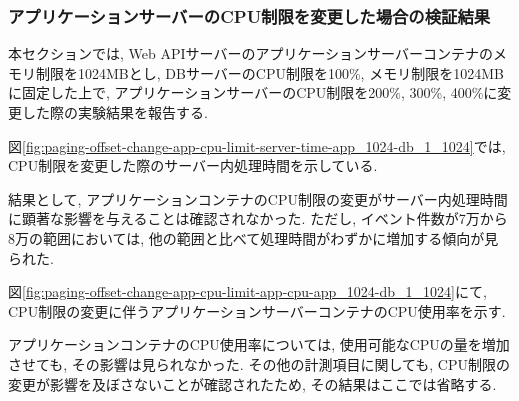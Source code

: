 \documentclass[../../../../main]{subfiles}
\begin{document}
    \subsubsection{アプリケーションサーバーのCPU制限を変更した場合の検証結果}\label{subsubsec:result-paging-offset-change-app-cpu}

    本セクションでは, Web APIサーバーのアプリケーションサーバーコンテナのメモリ制限を1024MBとし, DBサーバーのCPU制限を100\%, メモリ制限を1024MBに固定した上で, アプリケーションサーバーのCPU制限を200\%, 300\%, 400\%に変更した際の実験結果を報告する.


    図\ref{fig:paging-offset-change-app-cpu-limit-server-time-app_1024-db_1_1024}では, CPU制限を変更した際のサーバー内処理時間を示している.

    

    結果として, アプリケーションコンテナのCPU制限の変更がサーバー内処理時間に顕著な影響を与えることは確認されなかった. ただし, イベント件数が7万から8万の範囲においては, 他の範囲と比べて処理時間がわずかに増加する傾向が見られた.


    図\ref{fig:paging-offset-change-app-cpu-limit-app-cpu-app_1024-db_1_1024}にて, CPU制限の変更に伴うアプリケーションサーバーコンテナのCPU使用率を示す.

    

    アプリケーションコンテナのCPU使用率については, 使用可能なCPUの量を増加させても, その影響は見られなかった. その他の計測項目に関しても, CPU制限の変更が影響を及ぼさないことが確認されたため, その結果はここでは省略する.
\end{document}
